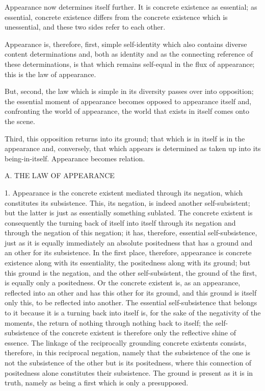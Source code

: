 Appearance now determines itself further.
It is concrete existence as essential;
as essential, concrete existence differs
from the concrete existence which is unessential,
and these two sides refer to each other.

Appearance is, therefore, first, simple self-identity
which also contains diverse content determinations
and, both as identity and as the connecting reference
of these determinations,
is that which remains self-equal
in the flux of appearance;
this is the law of appearance.

But, second, the law which is simple in its diversity
passes over into opposition;
the essential moment of appearance becomes
opposed to appearance itself
and, confronting the world of appearance,
the world that exists in itself comes onto the scene.

Third, this opposition returns into its ground;
that which is in itself is in the appearance
and, conversely, that which appears is determined
as taken up into its being-in-itself.
Appearance becomes relation.

A. THE LAW OF APPEARANCE

1. Appearance is the concrete existent
mediated through its negation,
which constitutes its subsistence.
This, its negation, is 
indeed another self-subsistent;
but the latter is just as 
essentially something sublated.
The concrete existent is
consequently the turning back of itself 
into itself through its negation
and through the negation of this negation;
it has, therefore, essential self-subsistence,
just as it is equally immediately an absolute positedness
that has a ground and an other for its subsistence.
In the first place, therefore, appearance is
concrete existence along with its essentiality,
the positedness along with its ground;
but this ground is the negation,
and the other self-subsistent,
the ground of the first,
is equally only a positedness.
Or the concrete existent is, as an appearance,
reflected into an other
and has this other for its ground,
and this ground is itself only this,
to be reflected into another.
The essential self-subsistence 
that belongs to it
because it is a turning back into itself is,
for the sake of the negativity of the moments,
the return of nothing through nothing back to itself;
the self-subsistence of the concrete existent is
therefore only the reflective shine of essence.
The linkage of the reciprocally grounding 
concrete existents consists, therefore, 
in this reciprocal negation,
namely that the subsistence of the one is not
the subsistence of the other but is its positedness,
where this connection of positedness 
alone constitutes their subsistence.
The ground is present as it is in truth,
namely as being a first which is only a presupposed.

